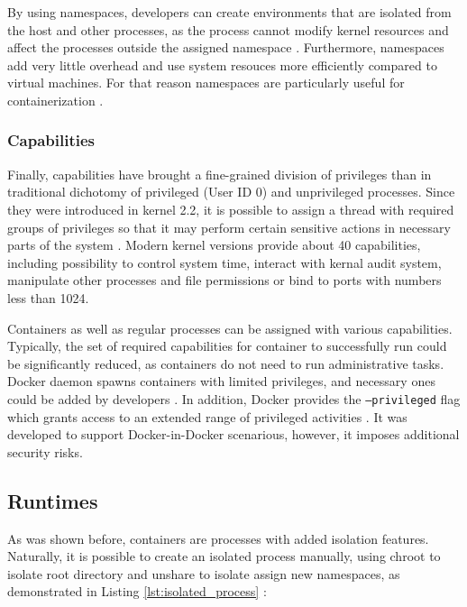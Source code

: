 By using namespaces, developers can create environments that are isolated from the host and other processes, as the process cannot modify kernel resources and affect the processes outside the assigned namespace \cite{d:dockersecurity}. Furthermore, namespaces add very little overhead and use system resouces more efficiently compared to virtual machines. For that reason namespaces are particularly useful for containerization \cite{c:1}.

\subsubsection{Capabilities}

Finally, capabilities have brought a fine-grained division of privileges than in traditional dichotomy of privileged (User ID 0) and unprivileged processes. Since they were introduced in kernel 2.2, it is possible to assign a thread with required groups of privileges so that it may perform certain sensitive actions in necessary parts of the system \cite{m:capabilities}. Modern kernel versions provide about 40 capabilities, including possibility to control system time, interact with kernal audit system, manipulate other processes and file permissions or bind to ports with numbers less than 1024.

Containers as well as regular processes can be assigned with various capabilities. Typically, the set of required capabilities for container to successfully run could be significantly reduced, as containers do not need to run administrative tasks. Docker daemon spawns containers with limited privileges, and necessary ones could be added by developers \cite{d:dockersecurity}. In addition, Docker provides the \texttt{--privileged} flag which grants access
to an extended range of privileged activities \cite{d:dockerrun}. It was developed to support Docker-in-Docker scenarious, however, it imposes additional security risks.


\subsection{Runtimes}

As was shown before, containers are processes with added isolation features. Naturally, it is possible to create an isolated process manually, using chroot to isolate root directory and unshare to isolate assign new namespaces, as demonstrated in Listing \ref{lst:isolated_process} \cite{book:rice}:

